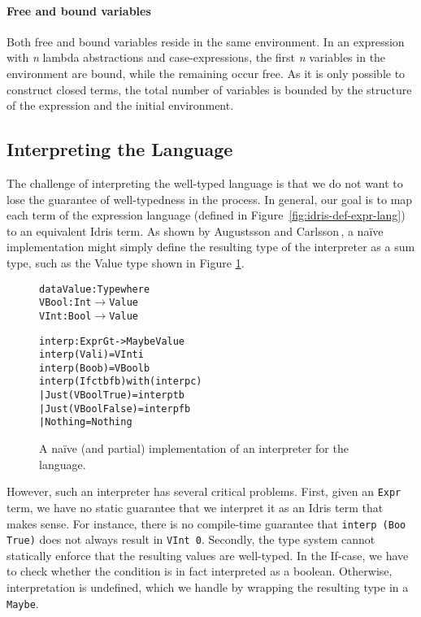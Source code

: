 \paragraph{Free and bound variables} Both free and bound variables reside in the same environment. In an expression with \textit{n} lambda abstractions and case-expressions, the first \textit{n} variables in the environment are bound, while the remaining occur free. As it is only possible to construct closed terms, the total number of variables is bounded by the structure of the expression and the initial environment.

\subsection{Interpreting the Language}
The challenge of interpreting the well-typed language is that we do not want to lose the guarantee of well-typedness in the process. In general, our goal is to map each term of the expression language (defined in Figure~\ref{fig:idris-def-expr-lang}) to an equivalent Idris term. As shown by Augustsson and Carlsson\,\cite{Augustsson99anexercise}, a na\"{i}ve implementation might simply define the resulting type of the interpreter as a sum type, such as the Value type shown in Figure \ref{fig:naive-interpreter-impl}.

\begin{figure}
\begin{alltt}
data Value : Type where
  VBool : Int \(\rightarrow\) Value
  VInt  : Bool \(\rightarrow\) Value

interp : Expr G t -> Maybe Value
interp (Val i) = VInt i
interp (Boo b) = VBool b
interp (If c tb fb) with (interp c)
  | Just (VBool True)  = interp tb
  | Just (VBool False) = interp fb
  | Nothing            = Nothing
\end{alltt}
\caption{A na\"{i}ve (and partial) implementation of an interpreter for the language.}
\label{fig:naive-interpreter-impl}
\end{figure}

However, such an interpreter has several critical problems. First, given an \texttt{Expr} term, we have no static guarantee that we interpret it as an Idris term that makes sense. For instance, there is no compile-time guarantee that \texttt{interp (Boo True)} does not always result in \texttt{VInt 0}. Secondly, the type system cannot statically enforce that the resulting values are well-typed. In the If-case, we have to check whether the condition is in fact interpreted as a boolean. Otherwise, interpretation is undefined, which we handle by wrapping the resulting type in a \texttt{Maybe}.

